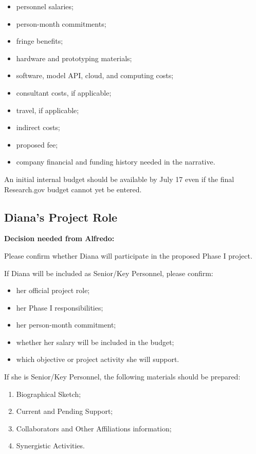 \documentclass[11pt,letterpaper]{article}
\begin{document}
\begin{itemize}[leftmargin=0.25in]
    \item personnel salaries;
    \item person-month commitments;
    \item fringe benefits;
    \item hardware and prototyping materials;
    \item software, model API, cloud, and computing costs;
    \item consultant costs, if applicable;
    \item travel, if applicable;
    \item indirect costs;
    \item proposed fee;
    \item company financial and funding history needed in the narrative.
\end{itemize}

An initial internal budget should be available by July 17 even if the final
Research.gov budget cannot yet be entered.

\subsection{Diana's Project Role}

\textbf{Decision needed from Alfredo:}

Please confirm whether Diana will participate in the proposed Phase I project.

If Diana will be included as Senior/Key Personnel, please confirm:

\begin{itemize}[leftmargin=0.25in]
    \item her official project role;
    \item her Phase I responsibilities;
    \item her person-month commitment;
    \item whether her salary will be included in the budget;
    \item which objective or project activity she will support.
\end{itemize}

If she is Senior/Key Personnel, the following materials should be prepared:

\begin{enumerate}[leftmargin=0.3in]
    \item Biographical Sketch;
    \item Current and Pending Support;
    \item Collaborators and Other Affiliations information;
    \item Synergistic Activities.
\end{enumerate}
\end{document}
